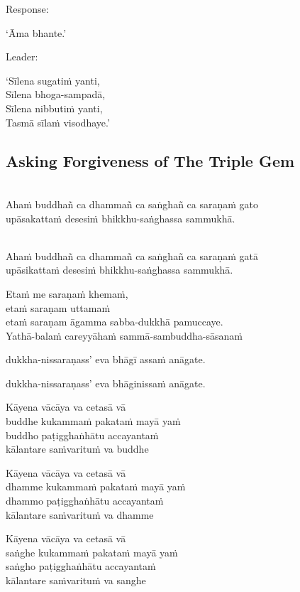 \ifhandbookedition
\enlargethispage{\baselineskip}
\fi

\begin{instruction}
  Response:
\end{instruction}

‘Āma bhante.’

\begin{instruction}
  Leader:
\end{instruction}

‘Sīlena sugatiṁ yanti,\\
Sīlena bhoga-sampadā,\\
Sīlena nibbutiṁ yanti,\\
Tasmā sīlaṁ visodhaye.’

\subsection{Asking Forgiveness of The Triple Gem}

\\\relax
Ahaṁ buddhañ ca dhammañ ca saṅghañ ca saraṇaṁ gato\\
upāsakattaṁ desesiṁ bhikkhu-saṅghassa sammukhā.

\\\relax
Ahaṁ buddhañ ca dhammañ ca saṅghañ ca saraṇaṁ gatā\\
upāsikattaṁ desesiṁ bhikkhu-saṅghassa sammukhā.

Etaṁ me saraṇaṁ khemaṁ,\\
etaṁ saraṇam uttamaṁ\\
etaṁ saraṇam āgamma sabba-dukkhā pamuccaye.\\
Yathā-balaṁ careyyāhaṁ sammā-sambuddha-sāsanaṁ

%
dukkha-nissaraṇass' eva bhāgī assaṁ anāgate.

%
dukkha-nissaraṇass' eva bhāginissaṁ anāgate.

Kāyena vācāya va cetasā vā\\
buddhe kukammaṁ pakataṁ mayā yaṁ\\
buddho paṭigghaṅhātu accayantaṁ\\
kālantare saṁvarituṁ va buddhe

Kāyena vācāya va cetasā vā\\
dhamme kukammaṁ pakataṁ mayā yaṁ\\
dhammo paṭigghaṅhātu accayantaṁ\\
kālantare saṁvarituṁ va dhamme

Kāyena vācāya va cetasā vā\\
saṅghe kukammaṁ pakataṁ mayā yaṁ\\
saṅgho paṭigghaṅhātu accayantaṁ\\
kālantare saṁvarituṁ va sanghe

